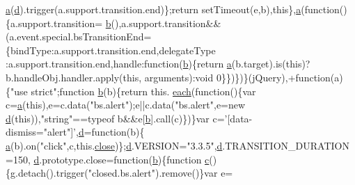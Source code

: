 \begin{DoxyCode}
      \hyperlink{bootstrap_8min_8js_ae8f6b400ed3390908c5cdeebed3a82b9}{a}(\hyperlink{bootstrap_8min_8js_aeb337d295abaddb5ec3cb34cc2e2bbc9}{d}).trigger(a.support.transition.end)\};\textcolor{keywordflow}{return} setTimeout(e,b),\textcolor{keyword}{this}\},\hyperlink{bootstrap_8min_8js_ae8f6b400ed3390908c5cdeebed3a82b9}{a}(\textcolor{keyword}{function}()\{a.support.transition=
      \hyperlink{bootstrap_8min_8js_ac0431efac4d7c393d1e70b86115cb93f}{b}(),a.support.transition&&(a.event.special.bsTransitionEnd=\{bindType:a.support.transition.end,delegateType
      :a.support.transition.end,handle:\textcolor{keyword}{function}(\hyperlink{bootstrap_8min_8js_ac0431efac4d7c393d1e70b86115cb93f}{b})\{\textcolor{keywordflow}{return} \hyperlink{bootstrap_8min_8js_ae8f6b400ed3390908c5cdeebed3a82b9}{a}(b.target).is(\textcolor{keyword}{this})?b.handleObj.handler.apply(\textcolor{keyword}{this},
      arguments):\textcolor{keywordtype}{void} 0\}\})\})\}(jQuery),+\textcolor{keyword}{function}(a)\{\textcolor{stringliteral}{"use strict"};\textcolor{keyword}{function} \hyperlink{bootstrap_8min_8js_ac0431efac4d7c393d1e70b86115cb93f}{b}(b)\{\textcolor{keywordflow}{return} this.
      \hyperlink{jquery_8min_8js_a18d9b499a0765bf2fe5f372ff2fc0236}{each}(\textcolor{keyword}{function}()\{var c=\hyperlink{bootstrap_8min_8js_ae8f6b400ed3390908c5cdeebed3a82b9}{a}(\textcolor{keyword}{this}),e=c.data(\textcolor{stringliteral}{"bs.alert"});e||c.data(\textcolor{stringliteral}{"bs.alert"},e=\textcolor{keyword}{new} 
      \hyperlink{bootstrap_8min_8js_aeb337d295abaddb5ec3cb34cc2e2bbc9}{d}(\textcolor{keyword}{this})),\textcolor{stringliteral}{"string"}==typeof b&&e[\hyperlink{bootstrap_8min_8js_ac0431efac4d7c393d1e70b86115cb93f}{b}].call(c)\})\}var c=\textcolor{stringliteral}{'[data-dismiss="alert"]'},\hyperlink{bootstrap_8min_8js_aeb337d295abaddb5ec3cb34cc2e2bbc9}{d}=\textcolor{keyword}{function}(b)\{
      \hyperlink{bootstrap_8min_8js_ae8f6b400ed3390908c5cdeebed3a82b9}{a}(b).on(\textcolor{stringliteral}{"click"},c,this.\hyperlink{bootstrap_8min_8js_a72fbb3628c3cc943ced8aad64247888c}{close})\};\hyperlink{bootstrap_8min_8js_aeb337d295abaddb5ec3cb34cc2e2bbc9}{d}.VERSION=\textcolor{stringliteral}{"3.3.5"},\hyperlink{bootstrap_8min_8js_aeb337d295abaddb5ec3cb34cc2e2bbc9}{d}.TRANSITION\_DURATION=150,
      \hyperlink{bootstrap_8min_8js_aeb337d295abaddb5ec3cb34cc2e2bbc9}{d}.prototype.close=\textcolor{keyword}{function}(\hyperlink{bootstrap_8min_8js_ac0431efac4d7c393d1e70b86115cb93f}{b})\{\textcolor{keyword}{function} \hyperlink{bootstrap_8min_8js_ad9d1ac02e33c4aed62ad517a7cb8b3fb}{c}()\{g.detach().trigger(\textcolor{stringliteral}{"closed.bs.alert"}).remove()\}var e=

\end{DoxyCode}
